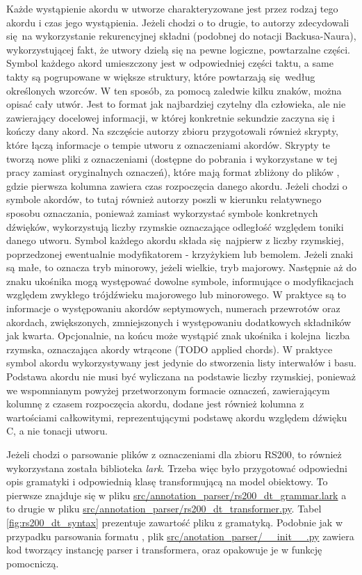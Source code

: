 Każde wystąpienie akordu w utworze charakteryzowane jest przez rodzaj tego akordu i czas jego
wystąpienia. Jeżeli chodzi o to drugie, to autorzy zdecydowali się na wykorzystanie rekurencyjnej
składni (podobnej do notacji Backusa-Naura), wykorzystującej fakt, że utwory dzielą się na pewne
logiczne, powtarzalne części. Symbol każdego akord umieszczony jest w odpowiedniej części taktu, a
same takty są pogrupowane w większe struktury, które powtarzają się według określonych wzorców. W
ten sposób, za pomocą zaledwie kilku znaków, można opisać cały utwór. Jest to format jak najbardziej
czytelny dla człowieka, ale nie zawierający docelowej informacji, w której konkretnie sekundzie
zaczyna się i kończy dany akord. Na szczęście autorzy zbioru przygotowali również skrypty, które
łączą informacje o tempie utworu z oznaczeniami akordów. Skrypty te tworzą nowe pliki z oznaczeniami
(dostępne do pobrania i wykorzystane w tej pracy zamiast oryginalnych oznaczeń), które mają format
zbliżony do plików , gdzie pierwsza kolumna zawiera czas rozpoczęcia danego akordu. Jeżeli
chodzi o symbole akordów, to tutaj również autorzy poszli w kierunku relatywnego sposobu oznaczania,
ponieważ zamiast wykorzystać symbole konkretnych dźwięków, wykorzystują liczby rzymskie oznaczające
odległość względem toniki danego utworu.  Symbol każdego akordu składa się najpierw z liczby
rzymskiej, poprzedzonej ewentualnie modyfikatorem - krzyżykiem lub bemolem. Jeżeli znaki są małe, to
oznacza tryb minorowy, jeżeli wielkie, tryb majorowy. Następnie aż do znaku ukośnika mogą występować
dowolne symbole, informujące o modyfikacjach względem zwykłego trójdźwieku majorowego lub
minorowego. W praktyce są to informacje o występowaniu akordów septymowych, numerach przewrotów oraz
akordach, zwiększonych, zmniejszonych i występowaniu dodatkowych składników jak kwarta. Opcjonalnie,
na końcu może wystąpić znak ukośnika i kolejna liczba rzymska, oznaczająca akordy wtrącone (TODO
applied chords). W praktyce symbol akordu wykorzystywany jest jedynie do stworzenia listy interwałów
i basu.  Podstawa akordu nie musi być wyliczana na podstawie liczby rzymskiej, ponieważ we
wspomnianym powyżej przetworzonym formacie oznaczeń, zawierającym kolumnę z czasem rozpoczęcia
akordu, dodane jest również kolumna z wartościami całkowitymi, reprezentującymi podstawę akordu
względem dźwięku C, a nie tonacji utworu.

Jeżeli chodzi o parsowanie plików z oznaczeniami dla zbioru RS200, to również wykorzystana została
biblioteka \emph{lark}. Trzeba więc było przygotować odpowiedni opis gramatyki i odpowiednią klasę
transformującą na model obiektowy. To pierwsze znajduje się w pliku
\url{src/annotation_parser/rs200_dt_grammar.lark} a to drugie w pliku
\url{src/annotation_parser/rs200_dt_transformer.py}. Tabel \ref{fig:rs200_dt_syntax} prezentuje
zawartość pliku z gramatyką. Podobnie jak w przypadku parsowania formatu , plik
\url{src/anotation_parser/__init__.py} zawiera kod tworzący instancję parser i transformera, oraz
opakowuje je w funkcję pomocniczą.

